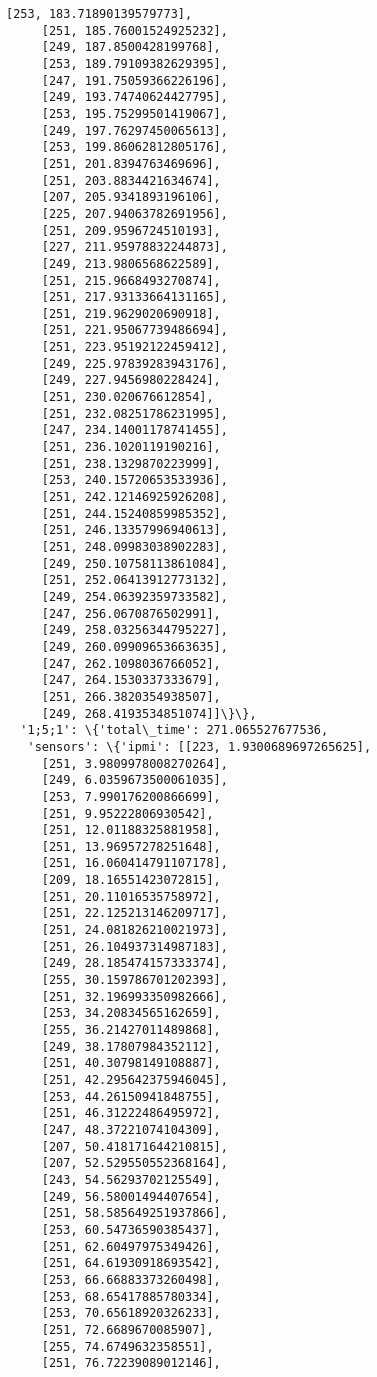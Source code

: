\documentclass[11pt]{article}
\begin{document}
\begin{tcolorbox}[breakable, size=fbox, boxrule=.5pt, pad at break*=1mm, opacityfill=0]
\begin{Verbatim}[commandchars=\\\{\}]
     [253, 183.71890139579773],
     [251, 185.76001524925232],
     [249, 187.8500428199768],
     [253, 189.79109382629395],
     [247, 191.75059366226196],
     [249, 193.74740624427795],
     [253, 195.75299501419067],
     [249, 197.76297450065613],
     [253, 199.86062812805176],
     [251, 201.8394763469696],
     [251, 203.8834421634674],
     [207, 205.9341893196106],
     [225, 207.94063782691956],
     [251, 209.9596724510193],
     [227, 211.95978832244873],
     [249, 213.9806568622589],
     [251, 215.9668493270874],
     [251, 217.93133664131165],
     [251, 219.9629020690918],
     [251, 221.95067739486694],
     [251, 223.95192122459412],
     [249, 225.97839283943176],
     [249, 227.9456980228424],
     [251, 230.020676612854],
     [251, 232.08251786231995],
     [247, 234.14001178741455],
     [251, 236.1020119190216],
     [251, 238.1329870223999],
     [253, 240.15720653533936],
     [251, 242.12146925926208],
     [251, 244.15240859985352],
     [251, 246.13357996940613],
     [251, 248.09983038902283],
     [249, 250.10758113861084],
     [251, 252.06413912773132],
     [249, 254.06392359733582],
     [247, 256.0670876502991],
     [249, 258.03256344795227],
     [249, 260.09909653663635],
     [247, 262.1098036766052],
     [247, 264.1530337333679],
     [251, 266.3820354938507],
     [249, 268.4193534851074]]\}\},
  '1;5;1': \{'total\_time': 271.065527677536,
   'sensors': \{'ipmi': [[223, 1.9300689697265625],
     [251, 3.9809978008270264],
     [249, 6.0359673500061035],
     [253, 7.990176200866699],
     [251, 9.95222806930542],
     [251, 12.01188325881958],
     [251, 13.96957278251648],
     [251, 16.060414791107178],
     [209, 18.16551423072815],
     [251, 20.11016535758972],
     [251, 22.125213146209717],
     [251, 24.081826210021973],
     [251, 26.104937314987183],
     [249, 28.185474157333374],
     [255, 30.159786701202393],
     [251, 32.196993350982666],
     [253, 34.20834565162659],
     [255, 36.21427011489868],
     [249, 38.17807984352112],
     [251, 40.30798149108887],
     [251, 42.295642375946045],
     [253, 44.26150941848755],
     [251, 46.31222486495972],
     [247, 48.37221074104309],
     [207, 50.418171644210815],
     [207, 52.529550552368164],
     [243, 54.56293702125549],
     [249, 56.58001494407654],
     [251, 58.585649251937866],
     [253, 60.54736590385437],
     [251, 62.60497975349426],
     [251, 64.61930918693542],
     [253, 66.66883373260498],
     [253, 68.65417885780334],
     [253, 70.65618920326233],
     [251, 72.6689670085907],
     [255, 74.6749632358551],
     [251, 76.72239089012146],

\end{Verbatim}
\end{tcolorbox}
\end{document}

